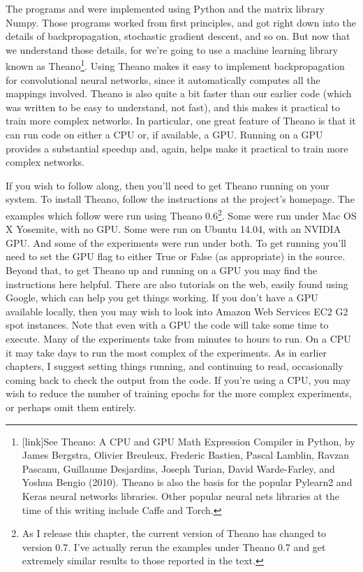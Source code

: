 \documentclass[a4paper,twoside,10pt]{book}
\begin{document}
The programs  and  were implemented using Python and the matrix library Numpy. Those programs worked from first principles, and got right down into the details of backpropagation, stochastic gradient descent, and so on. But now that we understand those details, for  we're going to use a machine learning library known as Theano\footnote{[link]See Theano: A CPU and GPU Math Expression Compiler in Python, by James Bergstra, Olivier Breuleux, Frederic Bastien, Pascal Lamblin, Ravzan Pascanu, Guillaume Desjardins, Joseph Turian, David Warde-Farley, and Yoshua Bengio (2010). Theano is also the basis for the popular Pylearn2 and Keras neural networks libraries. Other popular neural nets libraries at the time of this writing include Caffe and Torch.}. Using Theano makes it easy to implement backpropagation for convolutional neural networks, since it automatically computes all the mappings involved. Theano is also quite a bit faster than our earlier code (which was written to be easy to understand, not fast), and this makes it practical to train more complex networks. In particular, one great feature of Theano is that it can run code on either a CPU or, if available, a GPU. Running on a GPU provides a substantial speedup and, again, helps make it practical to train more complex networks.

If you wish to follow along, then you'll need to get Theano running on your system. To install Theano, follow the instructions at the project's homepage. The examples which follow were run using Theano 0.6\footnote{As I release this chapter, the current version of Theano has changed to version 0.7. I've actually rerun the examples under Theano 0.7 and get extremely similar results to those reported in the text.}. Some were run under Mac OS X Yosemite, with no GPU. Some were run on Ubuntu 14.04, with an NVIDIA GPU. And some of the experiments were run under both. To get  running you'll need to set the GPU flag to either True or False (as appropriate) in the  source. Beyond that, to get Theano up and running on a GPU you may find the instructions here helpful. There are also tutorials on the web, easily found using Google, which can help you get things working. If you don't have a GPU available locally, then you may wish to look into Amazon Web Services EC2 G2 spot instances. Note that even with a GPU the code will take some time to execute. Many of the experiments take from minutes to hours to run. On a CPU it may take days to run the most complex of the experiments. As in earlier chapters, I suggest setting things running, and continuing to read, occasionally coming back to check the output from the code. If you're using a CPU, you may wish to reduce the number of training epochs for the more complex experiments, or perhaps omit them entirely.
\end{document}
